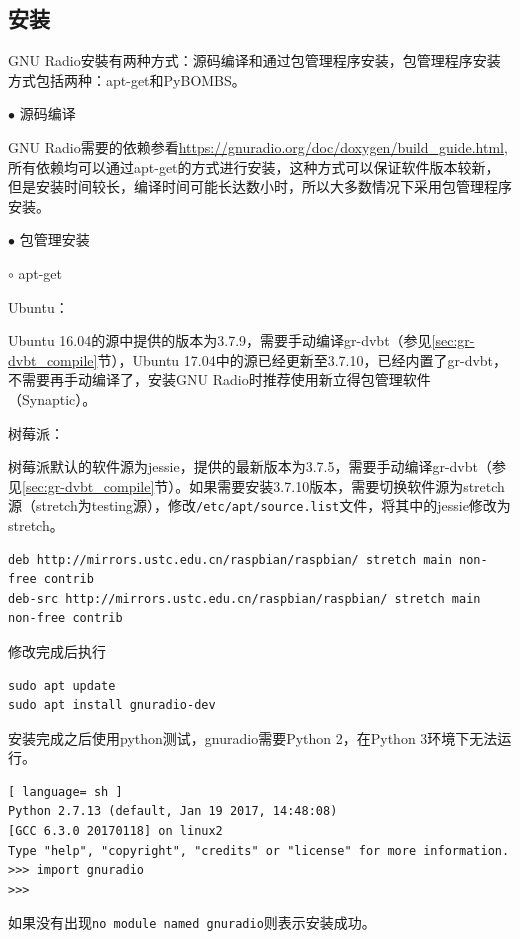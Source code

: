 		\subsection{安装}
			\par GNU Radio安裝有两种方式：源码编译和通过包管理程序安装，包管理程序安装方式包括两种：apt-get和PyBOMBS。
			\par\noindent $\bullet$ 源码编译
			\par GNU Radio需要的依赖参看\href{https://gnuradio.org/doc/doxygen/build\_guide.html}{https://gnuradio.org/doc/doxygen/build\_guide.html},所有依赖均可以通过apt-get的方式进行安装，这种方式可以保证软件版本较新，但是安装时间较长，编译时间可能长达数小时，所以大多数情况下采用包管理程序安装。
			\par\noindent $\bullet$ 包管理安装
			\par\noindent \qquad$\circ$ apt-get
			\par Ubuntu：
			\par Ubuntu 16.04的源中提供的版本为3.7.9，需要手动编译gr-dvbt（参见\ref{sec:gr-dvbt_compile}节），Ubuntu 17.04中的源已经更新至3.7.10，已经内置了gr-dvbt，不需要再手动编译了，安装GNU Radio时推荐使用新立得包管理软件（Synaptic）。
			\par 树莓派：
			\par 树莓派默认的软件源为jessie，提供的最新版本为3.7.5，需要手动编译gr-dvbt（参见\ref{sec:gr-dvbt_compile}节）。如果需要安装3.7.10版本，需要切换软件源为stretch源（stretch为testing源），修改\lstinline[language=sh]{/etc/apt/source.list}文件，将其中的jessie修改为stretch。
			\begin{lstlisting}
deb http://mirrors.ustc.edu.cn/raspbian/raspbian/ stretch main non-free contrib 
deb-src http://mirrors.ustc.edu.cn/raspbian/raspbian/ stretch main non-free contrib
			\end{lstlisting}
			\par 修改完成后执行
			\begin{lstlisting}
sudo apt update
sudo apt install gnuradio-dev
			\end{lstlisting}
			\par 安装完成之后使用python测试，gnuradio需要Python 2，在Python 3环境下无法运行。
			\begin{lstlisting}[ language= sh ]
Python 2.7.13 (default, Jan 19 2017, 14:48:08)
[GCC 6.3.0 20170118] on linux2
Type "help", "copyright", "credits" or "license" for more information.
>>> import gnuradio
>>>
			\end{lstlisting}
			\par 如果没有出现\lstinline[language=sh]{no module named gnuradio}则表示安装成功。
